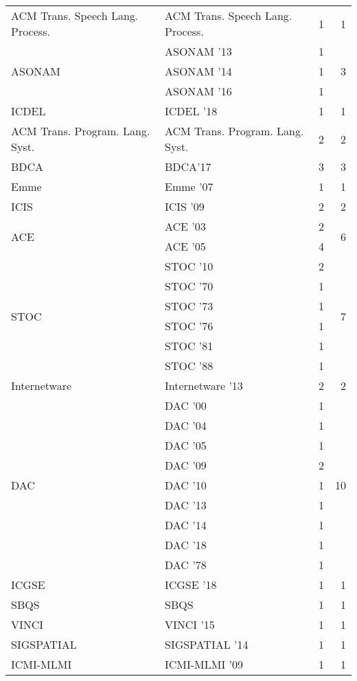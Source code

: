 \begin{table*}[t]
\begin{tabular}{llrr}
\multirow{1}{*}{ACM Trans. Speech Lang. Process.} & ACM Trans. Speech Lang. Process. & 1 & \multirow{1}{*}{1}\\
\multirow{3}{*}{ASONAM } & ASONAM '13 & 1 & \multirow{3}{*}{3}\\
& ASONAM '14 & 1 &\\
& ASONAM '16 & 1 &\\
\multirow{1}{*}{ICDEL } & ICDEL '18 & 1 & \multirow{1}{*}{1}\\
\multirow{1}{*}{ACM Trans. Program. Lang. Syst.} & ACM Trans. Program. Lang. Syst. & 2 & \multirow{1}{*}{2}\\
\multirow{1}{*}{BDCA} & BDCA'17 & 3 & \multirow{1}{*}{3}\\
\multirow{1}{*}{Emme } & Emme '07 & 1 & \multirow{1}{*}{1}\\
\multirow{1}{*}{ICIS } & ICIS '09 & 2 & \multirow{1}{*}{2}\\
\multirow{2}{*}{ACE } & ACE '03 & 2 & \multirow{2}{*}{6}\\
& ACE '05 & 4 &\\
\multirow{6}{*}{STOC } & STOC '10 & 2 & \multirow{6}{*}{7}\\
& STOC '70 & 1 &\\
& STOC '73 & 1 &\\
& STOC '76 & 1 &\\
& STOC '81 & 1 &\\
& STOC '88 & 1 &\\
\multirow{1}{*}{Internetware } & Internetware '13 & 2 & \multirow{1}{*}{2}\\
\multirow{9}{*}{DAC } & DAC '00 & 1 & \multirow{9}{*}{10}\\
& DAC '04 & 1 &\\
& DAC '05 & 1 &\\
& DAC '09 & 2 &\\
& DAC '10 & 1 &\\
& DAC '13 & 1 &\\
& DAC '14 & 1 &\\
& DAC '18 & 1 &\\
& DAC '78 & 1 &\\
\multirow{1}{*}{ICGSE } & ICGSE '18 & 1 & \multirow{1}{*}{1}\\
\multirow{1}{*}{SBQS} & SBQS & 1 & \multirow{1}{*}{1}\\
\multirow{1}{*}{VINCI } & VINCI '15 & 1 & \multirow{1}{*}{1}\\
\multirow{1}{*}{SIGSPATIAL } & SIGSPATIAL '14 & 1 & \multirow{1}{*}{1}\\
\multirow{1}{*}{ICMI-MLMI } & ICMI-MLMI '09 & 1 & \multirow{1}{*}{1}\\

\end{tabular}
\end{table*}
